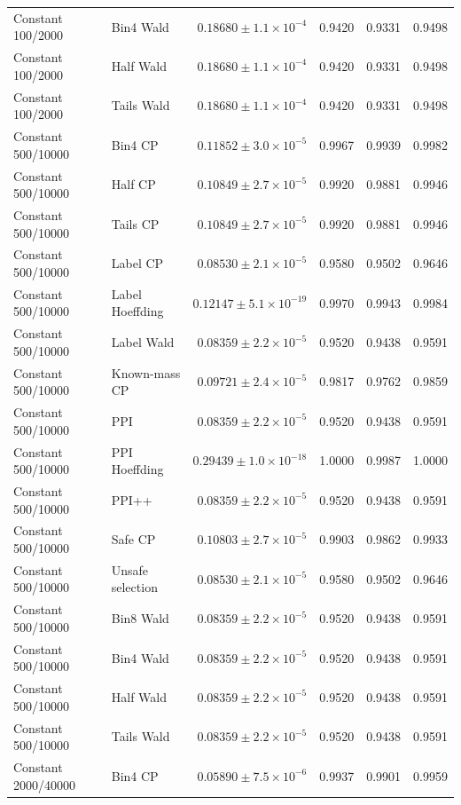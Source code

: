 \begin{longtable}{llrrrr}
Constant 100/2000 & Bin4 Wald & $0.18680\pm 1.1\times 10^{-4}$ & 0.9420 & 0.9331 & 0.9498 \\
Constant 100/2000 & Half Wald & $0.18680\pm 1.1\times 10^{-4}$ & 0.9420 & 0.9331 & 0.9498 \\
Constant 100/2000 & Tails Wald & $0.18680\pm 1.1\times 10^{-4}$ & 0.9420 & 0.9331 & 0.9498 \\
Constant 500/10000 & Bin4 CP & $0.11852\pm 3.0\times 10^{-5}$ & 0.9967 & 0.9939 & 0.9982 \\
Constant 500/10000 & Half CP & $0.10849\pm 2.7\times 10^{-5}$ & 0.9920 & 0.9881 & 0.9946 \\
Constant 500/10000 & Tails CP & $0.10849\pm 2.7\times 10^{-5}$ & 0.9920 & 0.9881 & 0.9946 \\
Constant 500/10000 & Label CP & $0.08530\pm 2.1\times 10^{-5}$ & 0.9580 & 0.9502 & 0.9646 \\
Constant 500/10000 & Label Hoeffding & $0.12147\pm 5.1\times 10^{-19}$ & 0.9970 & 0.9943 & 0.9984 \\
Constant 500/10000 & Label Wald & $0.08359\pm 2.2\times 10^{-5}$ & 0.9520 & 0.9438 & 0.9591 \\
Constant 500/10000 & Known-mass CP & $0.09721\pm 2.4\times 10^{-5}$ & 0.9817 & 0.9762 & 0.9859 \\
Constant 500/10000 & PPI & $0.08359\pm 2.2\times 10^{-5}$ & 0.9520 & 0.9438 & 0.9591 \\
Constant 500/10000 & PPI Hoeffding & $0.29439\pm 1.0\times 10^{-18}$ & 1.0000 & 0.9987 & 1.0000 \\
Constant 500/10000 & PPI++ & $0.08359\pm 2.2\times 10^{-5}$ & 0.9520 & 0.9438 & 0.9591 \\
Constant 500/10000 & Safe CP & $0.10803\pm 2.7\times 10^{-5}$ & 0.9903 & 0.9862 & 0.9933 \\
Constant 500/10000 & Unsafe selection & $0.08530\pm 2.1\times 10^{-5}$ & 0.9580 & 0.9502 & 0.9646 \\
Constant 500/10000 & Bin8 Wald & $0.08359\pm 2.2\times 10^{-5}$ & 0.9520 & 0.9438 & 0.9591 \\
Constant 500/10000 & Bin4 Wald & $0.08359\pm 2.2\times 10^{-5}$ & 0.9520 & 0.9438 & 0.9591 \\
Constant 500/10000 & Half Wald & $0.08359\pm 2.2\times 10^{-5}$ & 0.9520 & 0.9438 & 0.9591 \\
Constant 500/10000 & Tails Wald & $0.08359\pm 2.2\times 10^{-5}$ & 0.9520 & 0.9438 & 0.9591 \\
Constant 2000/40000 & Bin4 CP & $0.05890\pm 7.5\times 10^{-6}$ & 0.9937 & 0.9901 & 0.9959 \\

\end{longtable}
